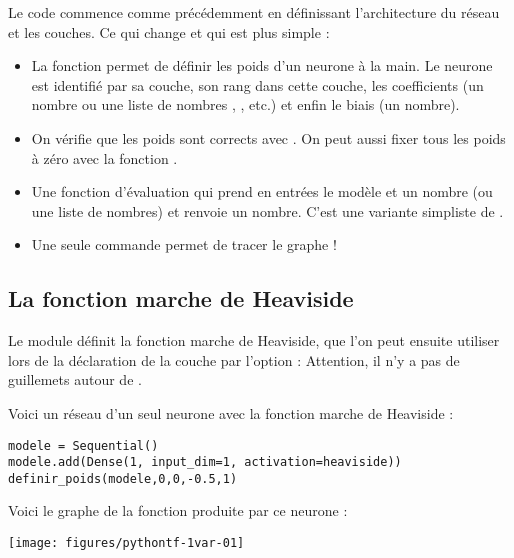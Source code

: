 \documentclass[11pt,class=report,crop=false]{standalone}
\begin{document}
Le code commence comme précédemment en définissant l'architecture du réseau et les couches.
Ce qui change et qui est plus simple :
\begin{itemize}
  \item La fonction 
  permet de définir les poids d'un neurone à la main. Le neurone est identifié par sa couche, son rang dans cette couche, les coefficients (un nombre  ou une liste de nombres \ci{[a1,a2]}, \ci{[a1,a2,a3]}, etc.) et enfin le biais (un nombre).

  \item On vérifie que les poids sont corrects avec .
  On peut aussi fixer tous les poids à zéro avec la fonction .

  \item Une fonction d'évaluation 
  qui prend en entrées le modèle et un nombre (ou une liste de nombres) et renvoie un nombre.
  C'est une variante simpliste de .
  
  \item Une seule commande permet de tracer le graphe !
\end{itemize}

\subsection{La fonction marche de Heaviside}

Le module  définit la fonction marche de Heaviside, que l'on peut ensuite utiliser lors de la déclaration de la couche par l'option :
Attention, il n'y a pas de guillemets autour de .

Voici un réseau d'un seul neurone avec la fonction marche de Heaviside :


\begin{lstlisting}
modele = Sequential()
modele.add(Dense(1, input_dim=1, activation=heaviside))
definir_poids(modele,0,0,-0.5,1)
\end{lstlisting}

Voici le graphe de la fonction produite par ce neurone :

\begin{center}
\texttt{[image: figures/pythontf-1var-01]}
\end{center}
\end{document}
